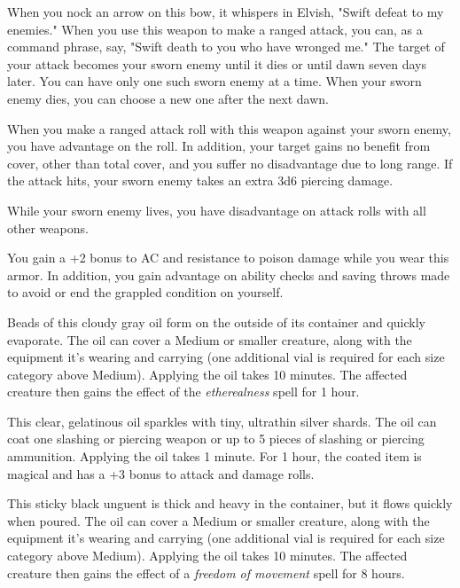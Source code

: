 \documentclass[10pt,a4paper,twoside,bg=print,twocolumn,openany,nodeprecatedcode]{dndbook}
\begin{document}
When you nock an arrow on this bow, it whispers in Elvish, "Swift defeat to my enemies." When you use this weapon to make a ranged attack, you can, as a command phrase, say, "Swift death to you who have wronged me." The target of your attack becomes your sworn enemy until it dies or until dawn seven days later. You can have only one such sworn enemy at a time. When your sworn enemy dies, you can choose a new one after the next dawn.

When you make a ranged attack roll with this weapon against your sworn enemy, you have advantage on the roll. In addition, your target gains no benefit from cover, other than total cover, and you suffer no disadvantage due to long range. If the attack hits, your sworn enemy takes an extra 3d6 piercing damage.

While your sworn enemy lives, you have disadvantage on attack rolls with all other weapons.

You gain a +2 bonus to AC and resistance to poison damage while you wear this armor. In addition, you gain advantage on ability checks and saving throws made to avoid or end the grappled condition on yourself.

Beads of this cloudy gray oil form on the outside of its container and quickly evaporate. The oil can cover a Medium or smaller creature, along with the equipment it's wearing and carrying (one additional vial is required for each size category above Medium). Applying the oil takes 10 minutes. The affected creature then gains the effect of the \textit{etherealness} spell for 1 hour.

This clear, gelatinous oil sparkles with tiny, ultrathin silver shards. The oil can coat one slashing or piercing weapon or up to 5 pieces of slashing or piercing ammunition. Applying the oil takes 1 minute. For 1 hour, the coated item is magical and has a +3 bonus to attack and damage rolls.

This sticky black unguent is thick and heavy in the container, but it flows quickly when poured. The oil can cover a Medium or smaller creature, along with the equipment it's wearing and carrying (one additional vial is required for each size category above Medium). Applying the oil takes 10 minutes. The affected creature then gains the effect of a \textit{freedom of movement} spell for 8 hours.
\end{document}
